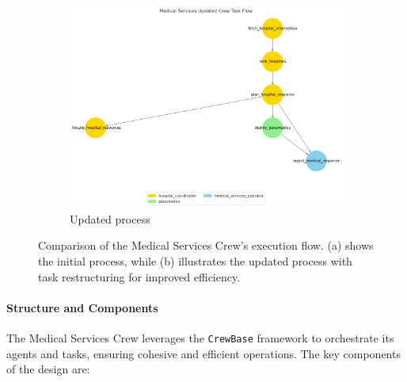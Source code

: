 \begin{figure}[H]
\begin{subfigure}[b]{0.7\textwidth}
        \centering
        \includegraphics[width=\textwidth]{figures/Medical_Services_Crew_Flow_updated.png}
        \caption{Updated process}
        \label{fig:updated_process}
    \end{subfigure}
    \caption{Comparison of the Medical Services Crew's execution flow. (a) shows the initial process, while (b) illustrates the updated process with task restructuring for improved efficiency.}
    \label{fig:exc_flow_ms_comparison}
\end{figure}

\paragraph{Structure and Components}
The Medical Services Crew leverages the \texttt{CrewBase} framework to orchestrate its agents and tasks, ensuring cohesive and efficient operations. The key components of the design are:

